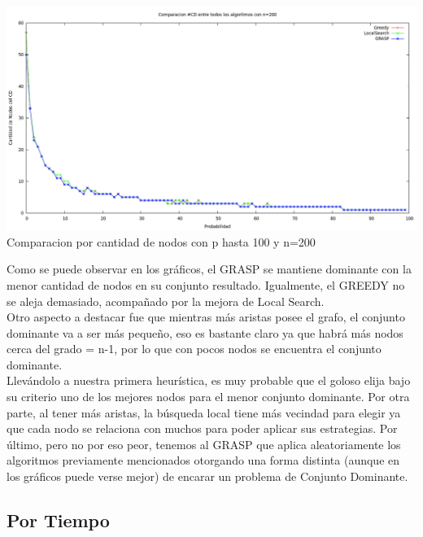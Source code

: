 \begin{center}
\includegraphics[width=17cm]{./graficos/comparacioncantCDprobvariablen200.png}\\
Comparacion por cantidad de nodos con p hasta 100 y n=200
\end{center}

Como se puede observar en los gráficos, el GRASP se mantiene dominante con la menor cantidad de nodos en su conjunto resultado.
Igualmente, el GREEDY no se aleja demasiado, acompañado por la mejora de Local Search.\\
Otro aspecto a destacar fue que mientras más aristas posee el grafo, el conjunto dominante va a ser más pequeño,
eso es bastante claro ya que habrá más nodos cerca del grado = n-1, por lo que con pocos nodos se encuentra el conjunto dominante.\\
Llevándolo a nuestra primera heurística, es muy probable que el goloso elija bajo su criterio uno de los mejores nodos para el menor
conjunto dominante. Por otra parte, al tener más aristas, la búsqueda local tiene más vecindad para elegir ya que cada nodo se relaciona con
muchos para poder aplicar sus estrategias. Por último, pero no por eso peor, tenemos al GRASP que aplica aleatoriamente los algoritmos previamente
mencionados otorgando una forma distinta (aunque en los gráficos puede verse mejor) de encarar un problema de Conjunto Dominante.


\subsection{Por Tiempo}


